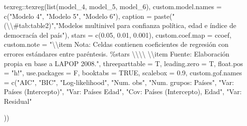\documentclass[
  12pt,
  a4paper,
]{article}
\newenvironment{Shaded}{\begin{snugshade}}{\end{snugshade}}
\newcommand{\AttributeTok}[1]{\textcolor[rgb]{0.77,0.63,0.00}{#1}}
\newcommand{\ConstantTok}[1]{\textcolor[rgb]{0.00,0.00,0.00}{#1}}
\newcommand{\FloatTok}[1]{\textcolor[rgb]{0.00,0.00,0.81}{#1}}
\newcommand{\FunctionTok}[1]{\textcolor[rgb]{0.00,0.00,0.00}{#1}}
\newcommand{\NormalTok}[1]{#1}
\newcommand{\SpecialCharTok}[1]{\textcolor[rgb]{0.00,0.00,0.00}{#1}}
\newcommand{\StringTok}[1]{\textcolor[rgb]{0.31,0.60,0.02}{#1}}
\begin{document}
\begin{Shaded}
\begin{Highlighting}[]
\NormalTok{texreg}\SpecialCharTok{::}\FunctionTok{texreg}\NormalTok{(}\FunctionTok{list}\NormalTok{(model\_4, model\_5, model\_6),}
               \AttributeTok{custom.model.names =} \FunctionTok{c}\NormalTok{(}\StringTok{"Modelo 4"}\NormalTok{,}
                                      \StringTok{"Modelo 5"}\NormalTok{,}
                                      \StringTok{"Modelo 6"}\NormalTok{),}
               \AttributeTok{caption =} \FunctionTok{paste}\NormalTok{(}\StringTok{"(}\SpecialCharTok{\textbackslash{}\textbackslash{}}\StringTok{\#tab:table2)"}\NormalTok{,}\StringTok{"Modelos multinivel para confianza política, edad e índice de democracía del país"}\NormalTok{),}
               \AttributeTok{stars =} \FunctionTok{c}\NormalTok{(}\FloatTok{0.05}\NormalTok{, }\FloatTok{0.01}\NormalTok{, }\FloatTok{0.001}\NormalTok{),}
               \AttributeTok{custom.coef.map =}\NormalTok{ ccoef,}
               \AttributeTok{custom.note =} \StringTok{"}\SpecialCharTok{\textbackslash{}\textbackslash{}}\StringTok{item Nota: Celdas contienen coeficientes de regresión con errores estándares entre paréntesis. \%stars }\SpecialCharTok{\textbackslash{}\textbackslash{}\textbackslash{}\textbackslash{}}\StringTok{ }\SpecialCharTok{\textbackslash{}\textbackslash{}}\StringTok{item Fuente: Elaboración propia en base a LAPOP 2008."}\NormalTok{,}
               \AttributeTok{threeparttable =}\NormalTok{ T,}
               \AttributeTok{leading.zero =}\NormalTok{ T,}
               \AttributeTok{float.pos =} \StringTok{"h!"}\NormalTok{,}
               \AttributeTok{use.packages =}\NormalTok{ F,}
               \AttributeTok{booktabs =} \ConstantTok{TRUE}\NormalTok{,}
               \AttributeTok{scalebox =} \FloatTok{0.9}\NormalTok{,}
               \AttributeTok{custom.gof.names =} \FunctionTok{c}\NormalTok{(}\StringTok{"AIC"}\NormalTok{, }
                                    \StringTok{"BIC"}\NormalTok{, }
                                    \StringTok{"Log{-}likelihood"}\NormalTok{, }
                                    \StringTok{"Num. obs"}\NormalTok{, }
                                    \StringTok{"Num. grupos: Países"}\NormalTok{,}
                                    \StringTok{"Var: Países (Intercepto)"}\NormalTok{,}
                                    \StringTok{"Var: Países Edad"}\NormalTok{,}
                                    \StringTok{"Cov: Países (Intercepto), Edad"}\NormalTok{,}
                                    \StringTok{"Var: Residual"}
                                     
\NormalTok{                                    ))}


\end{Highlighting}
\end{Shaded}
\end{document}
